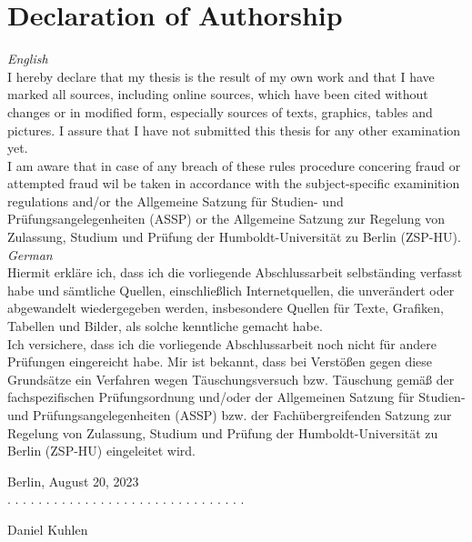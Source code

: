 \documentclass[a4paper,11pt]{article}
\newcommand{\thesisauthor}{Daniel Kuhlen}
\newcommand{\thesisdate}{August 20, 2023}
\begin{document}
\newpage
\thispagestyle{empty}
\hypertarget{declaration-of-authorship}{%
\section*{Declaration of Authorship}\label{declaration-of-authorship}}
\textit{English}
\vspace{0.2cm}
\\
\noindent
I hereby declare that my thesis is the result of my own work and that I have marked all sources, including online sources, which have been cited without changes or in modified form, especially sources of texts, graphics, tables and pictures. I assure that I have not submitted this thesis for any other examination yet.
\vspace{0.5cm}
\\
\noindent
I am aware that in case of any breach of these rules procedure concering fraud or attempted fraud wil be taken in accordance with the subject-specific examinition regulations and/or the Allgemeine Satzung für Studien- und Prüfungsangelegenheiten (ASSP) or the Allgemeine Satzung zur Regelung von Zulassung, Studium und Prüfung der Humboldt-Universität zu Berlin (ZSP-HU).
\vspace{0.5cm}
\\
\noindent
\textit{German}
\vspace{0.2cm}
\\
\noindent
\noindent Hiermit erkläre ich, dass ich die vorliegende Abschlussarbeit selbständing verfasst habe und sämtliche Quellen, einschließlich Internetquellen, die unverändert oder abgewandelt wiedergegeben werden, insbesondere Quellen für Texte, Grafiken, Tabellen und Bilder, als solche kenntliche gemacht habe.
\vspace{0.5cm}
\\
\noindent
Ich versichere, dass ich die vorliegende Abschlussarbeit noch nicht für andere Prüfungen eingereicht habe. Mir ist bekannt, dass bei Verstößen gegen diese Grundsätze ein Verfahren wegen Täuschungsversuch bzw. Täuschung gemäß der fachspezifischen Prüfungsordnung und/oder der Allgemeinen Satzung für Studien- und Prüfungsangelegenheiten (ASSP) bzw. der Fachübergreifenden Satzung zur Regelung von Zulassung, Studium und Prüfung der Humboldt-Universität zu Berlin (ZSP-HU) eingeleitet wird.

\vspace{1cm}
\noindent
Berlin, \thesisdate{}
\vspace{3cm}
\\
\noindent
. . . . . . . . . . . . . . . . . . . . . . . . . . . . . . .
\vspace{0.1cm}

\thesisauthor{}
\end{document}
